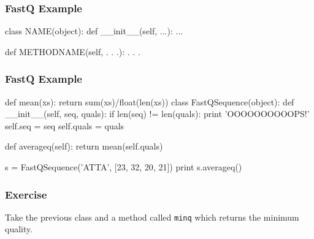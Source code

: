 \begin{frame}[fragile]
\frametitle{FastQ Example}

\begin{python}
class NAME(object):
    def __init__(self, ...):
        ...

    def METHODNAME(self, . . .):
        . . .
\end{python}

\end{frame}

\begin{frame}[fragile]
\frametitle{FastQ Example}

\begin{python}
def mean(xs):
    return sum(xs)/float(len(xs))
class FastQSequence(object):
    def __init__(self, seq, quals):
        if len(seq) != len(quals):
            print 'OOOOOOOOOOPS!'
        self.seq = seq
        self.quals = quals

    def averageq(self):
        return mean(self.quals)

s = FastQSequence('ATTA', [23, 32, 20, 21])
print s.averageq()
\end{python}

\end{frame}

\begin{frame}[fragile]
\frametitle{Exercise}
Take the previous class and a \alert{method} called \lstinline{minq} which
returns the minimum quality.

\end{frame}




